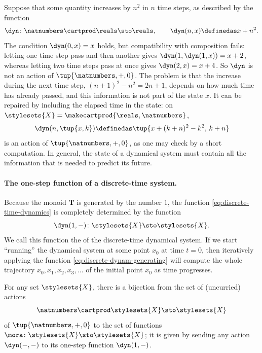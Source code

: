\begin{counterexample}
    \label{cexa:quadratic-growth}
    Suppose that some quantity increases by $n^2$ in $n$ time steps, as described by the function
    \begin{equation}
        \dyn \colon \natnumbers \cartprod \reals \sto \reals, \qquad \dyn(n, x) \definedas x + n^2.
    \end{equation}
    The condition $\dyn(0, x) = x$ holds, but compatibility with composition fails: letting one time step pass and then another gives $\dyn(1, \dyn(1, x)) = x + 2$, whereas letting two time steps pass at once gives $\dyn(2, x) = x + 4$.
    So $\dyn$ is not an action of $\tup{\natnumbers, +, 0}$.
    The problem is that the increase during the next time step, $(n + 1)^2 - n^2 = 2n + 1$, depends on how much time has already passed, and this information is not part of the state $x$.
    It can be repaired by including the elapsed time in the state: on $\stylesets{X} = \makecartprod{\reals, \natnumbers}$,
    \begin{equation}
        \dyn(n, \tup{x, k}) \definedas \tup{x + (k + n)^2 - k^2, \, k + n}
    \end{equation}
    is an action of $\tup{\natnumbers, +, 0}$, as one may check by a short computation.
    In general, the state of a dynamical system must contain all the information that is needed to predict its future.
\end{counterexample}

\paragraph{The one-step function of a discrete-time system.}
Because the monoid $\mathbf{T}$ is generated by the number $1$, the function \cref{eq:discrete-time-dynamics} is completely determined by the function
\begin{equation}\label{eq:discrete-dynam-generating}
    \dyn(1, - ) \colon \stylesets{X}   \sto \stylesets{X}.
\end{equation}
We call this function the  of the discrete-time dynamical system.
If we start ``running'' the dynamical system at some point $x_0$ at time $t = 0$, then iteratively applying the function \cref{eq:discrete-dynam-generating} will compute the whole trajectory $x_0, x_1, x_2, x_3, \dots$ of the initial point $x_0$ as time progresses.

\begin{lemma}
\label{lem:one-step-function}
For any set $\stylesets{X}$, there is a bijection from the set of (uncurried) actions
\begin{equation}
\natnumbers \cartprod \stylesets{X}  \sto \stylesets{X}
\end{equation}
of $\tup{\natnumbers, +, 0}$ to the set of functions $\mora \colon \stylesets{X} \sto \stylesets{X}$; it is given by sending any action $\dyn(- , -)$ to its one-step function $\dyn(1 , -)$.
\end{lemma}

